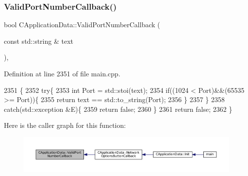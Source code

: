 \hypertarget{classCApplicationData_adc8125cc7c4ad01bdd43e6550c6ba133}{}\label{classCApplicationData_adc8125cc7c4ad01bdd43e6550c6ba133} 
\subsubsection{\texorpdfstring{Valid\+Port\+Number\+Callback()}{ValidPortNumberCallback()}}
{\footnotesize\ttfamily bool C\+Application\+Data\+::\+Valid\+Port\+Number\+Callback (\begin{DoxyParamCaption}\item[{const std\+::string \&}]{text }\end{DoxyParamCaption})\hspace{0.3cm}{\ttfamily [static]}, {\ttfamily [protected]}}



Definition at line 2351 of file main.\+cpp.


\begin{DoxyCode}
2351                                                                    \{
2352     \textcolor{keywordflow}{try}\{
2353         \textcolor{keywordtype}{int} Port = std::stoi(text);
2354         \textcolor{keywordflow}{if}((1024 < Port)&&(65535 >= Port))\{
2355             \textcolor{keywordflow}{return} text == std::to\_string(Port);
2356         \}
2357     \}
2358     \textcolor{keywordflow}{catch}(std::exception &E)\{
2359         \textcolor{keywordflow}{return} \textcolor{keyword}{false};
2360     \}
2361     \textcolor{keywordflow}{return} \textcolor{keyword}{false};
2362 \}
\end{DoxyCode}
Here is the caller graph for this function\+:
\nopagebreak
\begin{figure}[H]
\begin{center}
\leavevmode
\includegraphics[width=350pt]{classCApplicationData_adc8125cc7c4ad01bdd43e6550c6ba133_icgraph}
\end{center}
\end{figure}
\hypertarget{classCApplicationData_ae3216a4fccd68c9657d7e936b1a6df67}{}\label{classCApplicationData_ae3216a4fccd68c9657d7e936b1a6df67} 
